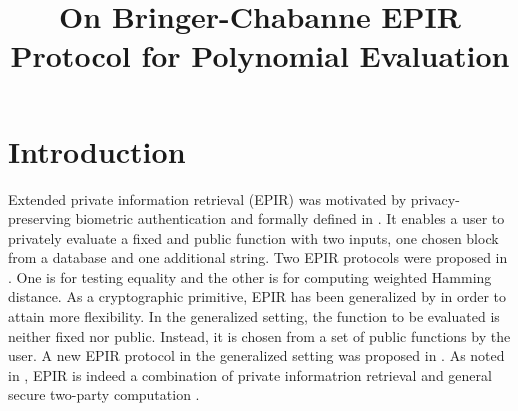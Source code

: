 \documentclass[JMC]{degruyter-journal}
\title{On  Bringer-Chabanne EPIR Protocol for Polynomial Evaluation}
\begin{document}
\section{Introduction}


Extended private information retrieval (EPIR) was  motivated by
privacy-preserving biometric authentication and formally defined in
\cite{BCPT07}. It enables a user to privately evaluate a fixed and
public function with two inputs, one chosen block from a database
and one additional string. Two EPIR protocols were proposed in
\cite{BCPT07}. One is
 for testing
equality and the other is for computing weighted Hamming distance.
As a  cryptographic primitive, EPIR has been generalized by
\cite{BC09} in order to attain more flexibility. In the generalized
setting, the function to be evaluated is neither fixed nor public.
Instead, it is chosen from a set of public functions by the user. A
new EPIR protocol
 in the generalized setting was  proposed in \cite{BC09}.
As noted in \cite{BCPT07}, EPIR is indeed a combination of private
informatrion retrieval \cite{CGKS95} and general secure two-party
computation \cite{Gol04}.
\end{document}
